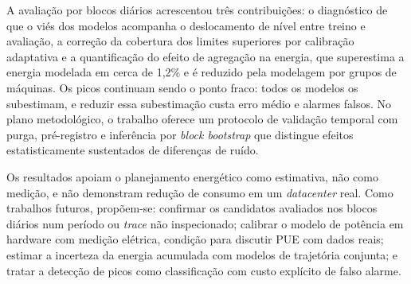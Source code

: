 \documentclass[a4paper,12pt]{article}
\begin{document}
A avaliação por blocos diários acrescentou três contribuições: o diagnóstico de que o viés dos modelos acompanha o deslocamento de nível entre treino e avaliação, a correção da cobertura dos limites superiores por calibração adaptativa e a quantificação do efeito de agregação na energia, que superestima a energia modelada em cerca de 1,2\% e é reduzido pela modelagem por grupos de máquinas. Os picos continuam sendo o ponto fraco: todos os modelos os subestimam, e reduzir essa subestimação custa erro médio e alarmes falsos. No plano metodológico, o trabalho oferece um protocolo de validação temporal com purga, pré-registro e inferência por \textit{block bootstrap} que distingue efeitos estatisticamente sustentados de diferenças de ruído.

Os resultados apoiam o planejamento energético como estimativa, não como medição, e não demonstram redução de consumo em um \textit{datacenter} real. Como trabalhos futuros, propõem-se: confirmar os candidatos avaliados nos blocos diários num período ou \textit{trace} não inspecionado; calibrar o modelo de potência em hardware com medição elétrica, condição para discutir PUE com dados reais; estimar a incerteza da energia acumulada com modelos de trajetória conjunta; e tratar a detecção de picos como classificação com custo explícito de falso alarme.


\newpage
\singlespacing


\end{document}
